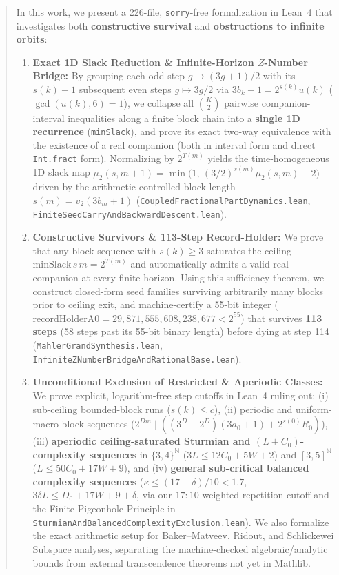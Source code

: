 \documentclass[11pt]{article}
\begin{document}
\begin{abstract}
In this work, we present a 226-file, \texttt{sorry}-free formalization in Lean~4 that investigates both \textbf{constructive survival} and \textbf{obstructions to infinite orbits}:
\begin{enumerate}
  \item \textbf{Exact 1D Slack Reduction \& Infinite-Horizon $Z$-Number Bridge:} By grouping each odd step $g \mapsto (3g+1)/2$ with its $s(k)-1$ subsequent even steps $g \mapsto 3g/2$ via $3 b_k + 1 = 2^{s(k)} u(k)$ ($\gcd(u(k), 6) = 1$), we collapse all $\binom{K}{2}$ pairwise companion-interval inequalities along a finite block chain into a \textbf{single 1D recurrence} (\texttt{minSlack}), and prove its exact two-way equivalence with the existence of a real companion (both in interval form and direct \texttt{Int.fract} form). Normalizing by $2^{T(m)}$ yields the time-homogeneous 1D slack map $\mu_2(s, m+1) = \min\big(1,\, (3/2)^{s(m)} \mu_2(s, m) - 2\big)$ driven by the arithmetic-controlled block length $s(m) = v_2(3 b_m + 1)$ (\texttt{CoupledFractionalPartDynamics.lean}, \texttt{FiniteSeedCarryAndBackwardDescent.lean}).
  \item \textbf{Constructive Survivors \& 113-Step Record-Holder:} We prove that any block sequence with $s(k) \ge 3$ saturates the ceiling $\mathrm{minSlack}\, s\, m = 2^{T(m)}$ and automatically admits a valid real companion at every finite horizon. Using this sufficiency theorem, we construct closed-form seed families surviving arbitrarily many blocks prior to ceiling exit, and machine-certify a 55-bit integer ($\mathrm{recordHolderA0} = 29{,}871{,}555{,}608{,}238{,}677 < 2^{55}$) that survives \textbf{113 steps} (58 steps past its 55-bit binary length) before dying at step 114 (\texttt{MahlerGrandSynthesis.lean}, \texttt{InfiniteZNumberBridgeAndRationalBase.lean}).
  \item \textbf{Unconditional Exclusion of Restricted \& Aperiodic Classes:} We prove explicit, logarithm-free step cutoffs in Lean~4 ruling out: (i) sub-ceiling bounded-block runs ($s(k) \le c$), (ii) periodic and uniform-macro-block sequences ($2^{D m} \mid ((3^D - 2^D)(3a_0+1) + 2^{s(0)} R_0)$), (iii) \textbf{aperiodic ceiling-saturated Sturmian and $(L+C_0)$-complexity sequences} in $\{3, 4\}^{\mathbb{N}}$ ($3 L \le 12 C_0 + 5 W + 2$) and $[3, 5]^{\mathbb{N}}$ ($L \le 50 C_0 + 17 W + 9$), and (iv) \textbf{general sub-critical balanced complexity sequences} ($\kappa \le (17-\delta)/10 < 1.7$, $3 \delta L \le D_0 + 17 W + 9 + \delta$, via our $17:10$ weighted repetition cutoff and the Finite Pigeonhole Principle in \texttt{SturmianAndBalancedComplexityExclusion.lean}). We also formalize the exact arithmetic setup for Baker--Matveev, Ridout, and Schlickewei Subspace analyses, separating the machine-checked algebraic/analytic bounds from external transcendence theorems not yet in Mathlib.

\end{enumerate}
\end{abstract}
\end{document}

